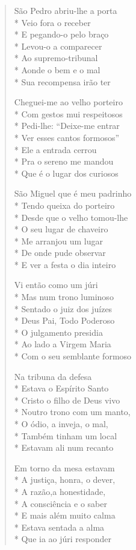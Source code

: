 \begin{verse}
São Pedro abriu-lhe a porta\\*
Veio fora o receber\\*
E pegando-o pelo braço\\*
Levou-o a comparecer\\*
Ao supremo-tribunal\\*
Aonde o bem e o mal\\*
Sua recompensa irão ter

Cheguei-me ao velho porteiro\\*
Com gestos mui respeitosos\\*
Pedi-lhe: ``Deixe-me entrar\\*
Ver esses cantos formosos''\\*
Ele a entrada cerrou\\*
Pra o sereno me mandou\\*
Que é o lugar dos curiosos

São Miguel que é meu padrinho\\*
Tendo queixa do porteiro\\*
Desde que o velho tomou-lhe\\*
O seu lugar de chaveiro\\*
Me arranjou um lugar\\*
De onde pude observar\\*
E ver a festa o dia inteiro

Vi então como um júri\\*
Mas num trono luminoso\\*
Sentado o juiz dos juízes\\*
Deus Pai, Todo Poderoso\\*
O julgamento presidia\\*
Ao lado a Virgem Maria\\*
Com o seu semblante formoso

Na tribuna da defesa\\*
Estava o Espírito Santo\\*
Cristo o filho de Deus vivo\\*
Noutro trono com um manto,\\*
O ódio, a inveja, o mal,\\*
Também tinham um local\\*
Estavam ali num recanto

Em torno da mesa estavam\\*
A justiça, honra, o dever,\\*
A razão,a honestidade,\\*
A consciência e o saber\\*
E mais além muito calma\\*
Estava sentada a alma\\*
Que ia ao júri responder


\end{verse}
